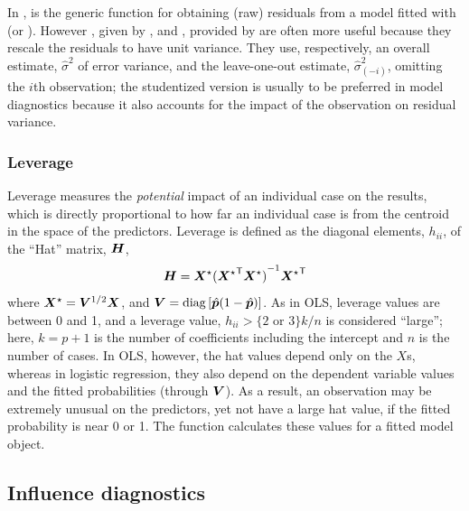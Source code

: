 \documentclass[11pt]{book}\usepackage[]{graphicx}\usepackage[]{color}
\begin{document}
In \R,  is the generic function for obtaining (raw) residuals from
a model fitted with  (or ). However ,
given by , and
 ,
provided by  are often more useful
because they rescale the residuals to have unit variance.
They use, respectively, an overall estimate, $\hat{\sigma}^2$ of error variance, and the
leave-one-out estimate, $\hat{\sigma}_{(-i)}^2$, omitting the $i$th observation;
the studentized version is usually to be preferred in model diagnostics because
it also accounts for the impact of the observation on residual variance.


\subsubsection{Leverage}
Leverage measures the \emph{potential} impact of an individual case
on the results, which is directly proportional to how far an
individual case is from the centroid in the space of the
predictors.  Leverage is defined as the diagonal elements,
\(h_{ii}\), of the ``Hat'' matrix, \(\bm{H}\),
\begin{equation*}%
\mat{H} = {\mat{X}}^\star
{( {\mat{X}^\star}\trans {\mat{X}}^\star )}^{-1} {\mat{X}^\star}\trans
\end{equation*}
where \({\bm{X}} ^\star = {\bm{V}}^{1/2} \bm{X}\), and \(\bm{V}  =
\mathrm{diag}\, [ \hat{\bm{p}} ( 1 - \hat{\bm{p}})] \).  As in OLS,
leverage values are between 0 and 1, and a leverage value,
\(h_{ii}  > \{2 \mbox{ or } 3 \} k /  n\) is considered ``large''; here, \(k=p+1\) is the
number of coefficients including the intercept and \(n\) is the number of cases. 
In OLS, however, the hat values depend only on the $X$s, whereas
in logistic regression, they also depend on the dependent
variable values and the fitted probabilities (through $\bm{V}$).
As a result, an observation may be extremely unusual on the predictors,
yet not have a large hat value, if the fitted probability is near 0 or 1.
The function  calculates these values for a fitted
 model object.


\subsection{Influence diagnostics}\label{sec:logist-infldiag}
\end{document}
